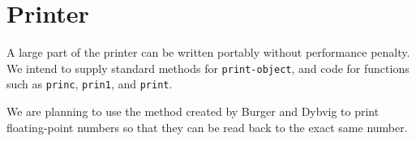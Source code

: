 \chapter{Printer}

A large part of the printer can be written portably without
performance penalty.  We intend to supply standard methods for
\texttt{print-object}, and code for functions such as \texttt{princ},
\texttt{prin1}, and \texttt{print}. 

We are planning to use the method created by Burger and Dybvig
\cite{Burger:1996:PFN:231379.231397} to print floating-point numbers
so that they can be read back to the exact same number.
